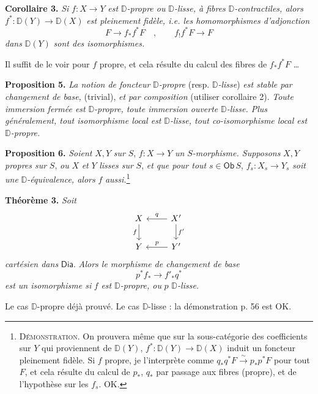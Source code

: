 \documentclass[11pt,leqno]{article}
\newcommand{\printedpage}[1]{\marginpar{\footnotesize p.~#1}}
\newcommand{\msp}[1]{\marginpar{\footnotesize [#1]}}
\newcommand{\Dia}{\mathsf{Dia}}
\newcommand{\Ob}{\mathsf{Ob}}
\newcommand{\D}{\mathbb{D}}
\begin{document}
\noindent\textbf{Corollaire 3.} \textit{Si} $f : X \to Y$ \textit{est} $\D$\textit{-propre ou} $\D$\textit{-lisse, à fibres} $\D$\textit{-contractiles, alors} $f^* : \D(Y) \to \D(X)$ \textit{est pleinement fidèle, i.e. les homomorphismes d'adjonction}
\[
F \longrightarrow f_*f^*F \quad , \qquad f_!f^*F \longrightarrow F
\]
\textit{dans} $\D(Y)$ \textit{sont des isomorphismes.}

\noindent Il suffit de le voir pour $f$ propre, et cela résulte du calcul des fibres de $f_*f^*F$ \ldots

\noindent\textbf{Proposition 5.} \textit{La notion de foncteur} $\D$\textit{-propre} (resp. $\D$\textit{-lisse}) \textit{est stable par changement de base,} (trivial), \textit{et par composition} (utiliser corollaire 2). \textit{Toute immersion fermée est} $\D$\textit{-propre, toute immersion ouverte} $\D$\textit{-lisse. Plus généralement, tout isomorphisme local est} $\D$\textit{-lisse, tout co-isomorphisme local est} $\D$\textit{-propre.}

\noindent\textbf{Proposition 6.} \textit{Soient} $X, Y$ \textit{sur} $S$, $f : X \to Y$ \textit{un} $S$\textit{-morphisme. Supposons} $X, Y$ \textit{propres sur} $S$, \textit{ou} $X$ \textit{et} $Y$ \textit{lisses sur} $S$, \textit{et que pour tout} $s \in \Ob\, S$, $f_s : X_s \to Y_s$ \textit{soit une} $\D$\textit{-équivalence, alors} $f$ \textit{aussi.}\footnote[32]{\textsc{Démonstration}. On prouvera même que sur la sous-catégorie des coefficients sur $Y$ qui proviennent de $\D(Y)$, $f^* : \D(Y) \to \D(X)$ induit un foncteur pleinement fidèle. Si $f$ propre, je l'interprète comme $q_*q^*F \overset{\sim}{\to} p_*p^*F$ pour tout $F$, et cela résulte du calcul de $p_*$, $q_*$ par passage aux fibres (propre), et de l'hypothèse sur les $f_s$. OK.}

\msp{page 72}

\noindent\textbf{Théorème 3.} \textit{Soit}
\[
\begin{tikzcd}
X \arrow[d, "f"{swap}] & X' \arrow[l, "q"{swap}] \arrow[d, "f'"] \\
Y & Y' \arrow[l, "p"{swap}]
\end{tikzcd}
\]
\textit{cartésien dans} $\Dia$. \textit{Alors le morphisme de changement de base}
\[
p^*f_* \longrightarrow f'_*q^*
\]
\textit{est un isomorphisme si} $f$ \textit{est} $\D$\textit{-propre, ou} $p$ $\D$\textit{-lisse.}

\noindent Le cas $\D$-propre déjà prouvé. Le cas $\D$-lisse : la démonstration p. 56 est OK.

\printedpage{43}
\end{document}
